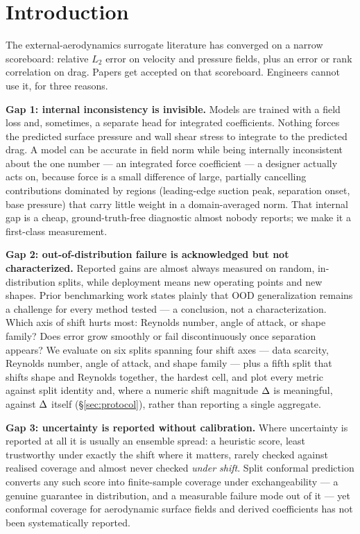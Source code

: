 \documentclass[11pt,a4paper]{article}
\begin{document}
\section{Introduction}
\label{sec:intro}

The external-aerodynamics surrogate literature has converged on a narrow
scoreboard: relative $L_2$ error on velocity and pressure fields, plus an error
or rank correlation on drag. Papers get accepted on that scoreboard. Engineers
cannot use it, for three reasons.

\textbf{Gap 1: internal inconsistency is invisible.} Models are trained with a
field loss and, sometimes, a separate head for integrated coefficients. Nothing
forces the predicted surface pressure and wall shear stress to integrate to the
predicted drag. A model can be accurate in field norm while being internally
inconsistent about the one number --- an integrated force coefficient --- a
designer actually acts on, because force is a small difference of large,
partially cancelling contributions dominated by regions (leading-edge suction
peak, separation onset, base pressure) that carry little weight in a
domain-averaged norm. That internal gap is a cheap, ground-truth-free diagnostic
almost nobody reports; we make it a first-class measurement.

\textbf{Gap 2: out-of-distribution failure is acknowledged but not
characterized.} Reported gains are almost always measured on random,
in-distribution splits, while deployment means new operating points and new
shapes. Prior benchmarking work states plainly that OOD generalization remains
a challenge for every method tested \citep{rabeh2025benchmarking} --- a
conclusion, not a characterization. Which axis of shift hurts most: Reynolds
number, angle of attack, or shape family? Does error grow smoothly or fail
discontinuously once separation appears? We evaluate on six splits spanning four
shift axes --- data scarcity, Reynolds number, angle of attack, and shape family
--- plus a fifth split that shifts shape and Reynolds together, the hardest
cell, and plot every metric against split identity and, where a numeric shift
magnitude $\Delta$ is meaningful, against $\Delta$ itself (\S\ref{sec:protocol}),
rather than reporting a single aggregate.

\textbf{Gap 3: uncertainty is reported without calibration.} Where uncertainty
is reported at all it is usually an ensemble spread: a heuristic score, least
trustworthy under exactly the shift where it matters, rarely checked against
realised coverage and almost never checked \emph{under shift}. Split conformal
prediction converts any such score into finite-sample coverage under
exchangeability --- a genuine guarantee in distribution, and a measurable
failure mode out of it --- yet conformal coverage for aerodynamic surface fields
and derived coefficients has not been systematically reported.
\end{document}
